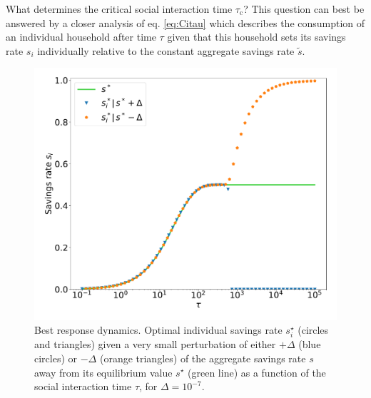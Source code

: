 What determines the critical social interaction time $\tau_\mathrm{c}$?
This question can best be answered by a closer analysis of eq. \eqref{eq:Citau} which describes the consumption of an individual household after time $\tau$ given that this household sets its savings rate $s_i$ individually relative to the constant aggregate savings rate $\tilde{s}$. 
\begin{figure}
  \centering
  \hspace{-1.5cm}\includegraphics[width = .7 \textwidth]{figures/best_response.pdf}
  \caption[Best response dynamics for individuals savings rates]{Best response dynamics. Optimal individual savings rate $s_i^\star$ (circles and triangles) given a very small perturbation of either $+\Delta$ (blue circles) or $-\Delta$ (orange triangles) of the aggregate savings rate $s$ away from its equilibrium value $s^\star$ (green line) as a function of the social interaction time $\tau$, for $\Delta = 10^{-7}$.}\hspace{.5cm}
  \label{fig:best_response}
\end{figure}

